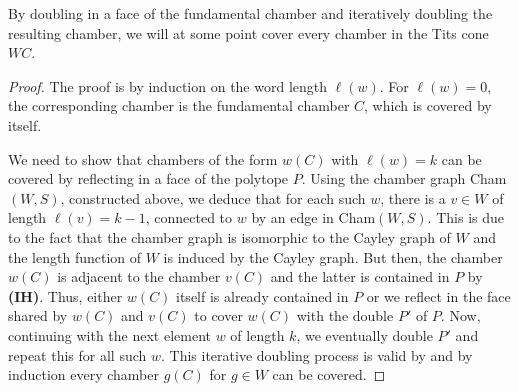 \begin{theorem}
    By doubling in a face of the fundamental chamber and iteratively doubling the resulting chamber, we will at some point cover every chamber in the Tits cone \(WC\).
\end{theorem}
\begin{proof}
    The proof is by induction on the word length \(\ell(w)\).
    For \(\ell(w) = 0\), the corresponding chamber is the fundamental chamber \(C\), which is covered by itself.
    \par\noindent
    We need to show that chambers of the form \(w(C)\) with \(\ell(w) = k\) can be covered by reflecting in a face of the polytope \(P\).
    Using the chamber graph Cham\((W, S)\), constructed above, we deduce that for each such \(w\), there is a \(v \in W\) of length \(\ell(v) = k - 1\), connected to \(w\) by an edge in Cham\((W, S)\). %
    This is due to the fact that the chamber graph is isomorphic to the Cayley graph of  \(W\) and the length function of \(W\) is induced by the Cayley graph.
    But then, the chamber \(w(C)\) is adjacent to the chamber \(v(C)\) and the latter is contained in \(P\) by \textbf{(IH)}.
    Thus, either \(w(C)\) itself is already contained in \(P\) or we reflect in the face shared by \(w(C)\) and \(v(C)\) to cover \(w(C)\) with the double \(P'\) of \(P\).
    Now, continuing with the next element \(w\) of length \(k\), we eventually double \(P'\) and repeat this for all such \(w\).
    This iterative doubling process is valid by  and by induction every chamber \(g(C)\) for \(g \in W\) can be covered.
\end{proof}

